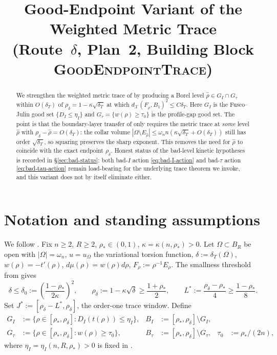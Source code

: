 \documentclass[11pt]{article}
\title{Good-Endpoint Variant of the Weighted Metric Trace\\
       (Route~$\delta$, Plan~2, Building Block \textsc{GoodEndpointTrace})}
\author{}
\date{}
\theoremstyle{definition}
\newcommand{\Om}{\Omega}
\newcommand{\rstar}{\rho_{*}}
\newcommand{\rdel}{\rho_\delta}
\newcommand{\rhad}{\widehat\rho}
\newcommand{\X}{\mathcal X}
\begin{document}
\maketitle

\begin{abstract}
We strengthen the weighted metric trace of \cite{WeightedMetricTrace} by
producing a Borel level $\rhad\in G_I\cap G_\tau$ within
$O(\delta_T)$ of $\rdel=1-\kappa\sqrt{\delta_T}$ at which
$d_\X(F_{\rhad},B_1)^2\le C\delta_T$.  Here $G_I$ is the
Fusco--Julin good set $\{D_I\le\eta_I\}$ and
$G_\tau=\{w(\rho)\ge\tau_0\}$ is the profile-gap good set.  The point is
that the boundary-layer transfer of \cite{BoundaryLayerTransfer} only
requires the metric trace at \emph{some} level $\rhad$ with
$\rdel-\rhad=O(\delta_T)$: the collar volume
$|\Om\setminus E_{\rhad}|\le \omega_n n(\kappa\sqrt{\delta_T}+O(\delta_T))$
still has order $\sqrt{\delta_T}$, so squaring preserves the sharp
exponent.  This removes the need for $\rhad$ to coincide with the exact
endpoint $\rdel$.  Honest status of the bad-level kinetic hypotheses is
recorded in \S\ref{sec:bad-status}: both bad-$I$ action
\eqref{eq:bad-I-action} and bad-$\tau$ action
\eqref{eq:bad-tau-action} remain load-bearing for the underlying trace
theorem we invoke, and this variant does not by itself eliminate either.
\end{abstract}

\section{Notation and standing assumptions}\label{sec:notation}

We follow \cite{WeightedMetricTrace}.  Fix $n\ge 2$, $R\ge 2$,
$\rstar\in(0,1)$, $\kappa=\kappa(n,\rstar)>0$.  Let $\Om\subset B_R$ be
open with $|\Om|=\omega_n$, $u=u_\Om$ the variational torsion function,
$\delta:=\delta_T(\Om)$, $w(\rho)=-t'(\rho)$,
$d\mu(\rho)=w(\rho)d\rho$, $F_\rho:=\rho^{-1}E_\rho$.
The smallness threshold from
\cite[(eq:delta-smallness)]{WeightedMetricTrace} gives
\[
   \delta\le \delta_0:=\left(\frac{1-\rstar}{2\kappa}\right)^2,
   \qquad
   \rdel:=1-\kappa\sqrt\delta\ge\frac{1+\rstar}{2},
   \qquad
   L^*:=\frac{\rdel-\rstar}{4}\ge\frac{1-\rstar}{8}.
\]
Set $J^*:=[\rdel-L^*,\rdel]$, the order-one trace window.  Define
\begin{align*}
   G_I &:= \{\rho\in[\rstar,\rdel]:D_I(t(\rho))\le\eta_I\},
   & B_I &:= [\rstar,\rdel]\setminus G_I,\\
   G_\tau &:= \{\rho\in[\rstar,\rdel]:w(\rho)\ge\tau_0\},
   & B_\tau &:= [\rstar,\rdel]\setminus G_\tau,
   & \tau_0&:=\rstar/(2n),
\end{align*}
where $\eta_I=\eta_I(n,R,\rstar)>0$ is fixed in
\cite[Hyp.~3.5]{WeightedMetricTrace}.
\end{document}
